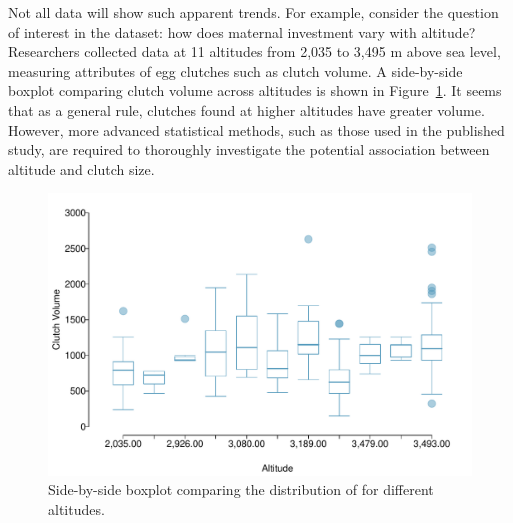 

Not all data will show such apparent trends. For example, consider the question of interest in the  dataset: how does maternal investment vary with altitude? Researchers collected data at 11 altitudes from 2,035 to 3,495 m above sea level, measuring attributes of egg clutches such as clutch volume. A side-by-side boxplot comparing clutch volume across altitudes is shown in Figure~\ref{frogClutchVolAlt}. It seems that as a general rule, clutches found at higher altitudes have greater volume. However, more advanced statistical methods, such as those used in the published study, are required to thoroughly investigate the potential association between altitude and clutch size. 

\begin{figure}[h!]
	\centering
	\includegraphics[width=\textwidth]{ch_intro_to_data_oi_biostat/figures/frogClutchVolAlt/frogClutchVolAlt}
	\caption{Side-by-side boxplot comparing the distribution of  for different altitudes.}
	\label{frogClutchVolAlt}
\end{figure} 


